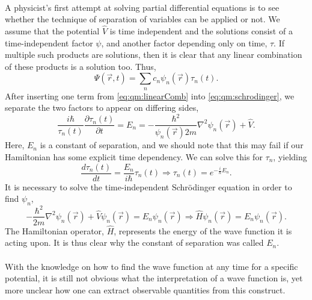 \paragraph*{}
A physicist's first attempt at solving partial differential equations is to see whether the technique of separation of variables can be applied or not.
We assume that the potential $\hat{V}$ is time independent and the solutions consist of a time-independent factor $\psi$, and another factor depending only on time, $\tau$.
If multiple such products are solutions, then it is clear that any linear
combination of these products is a solution too.
Thus,
\begin{equation}
\label{eq:qm:linearComb}
\Psi(\vec{r},t) = \sum_n c_n \psi_n(\vec{r}) \tau_n(t).
\end{equation}
After inserting one term from \eqref{eq:qm:linearComb} into \eqref{eq:qm:schrodinger}, we separate the two factors to appear on
differing sides,
\begin{equation}
\frac{i\hbar}{\tau_n(t)} \frac{\partial \tau_n(t)}{\partial t} =
E_n =
- \frac{\hbar^2}{\psi_n(\vec{r}) 2m} \nabla^2 \psi_n(\vec{r}) + \hat{V} .
\end{equation}
Here, $E_n$ is a constant of separation, and we should note that this may fail
if our Hamiltonian has some explicit time dependency.
We can solve this for $\tau_n$, yielding
\begin{equation}
\frac{d\tau_n(t)}{dt} = \frac{E_n}{i\hbar} \tau_n(t)
\Rightarrow
\tau_n(t) = e^{-\frac{i}{\hbar}E_n} .
\end{equation}
It is necessary to solve the time-independent Schrödinger
equation in order to find $\psi_n$,
\begin{equation}
\label{eq:qm:schrodingernotime}
- \frac{\hbar^2}{2m} \nabla^2 \psi_n(\vec{r}) + \hat{V} \psi_n(\vec{r}) = E_n
\psi_n(\vec{r})
\Rightarrow
\hat{H} \psi_n(\vec{r}) = E_n \psi_n(\vec{r}) .
\end{equation}
The Hamiltonian operator, $\hat{H}$, represents the energy of the wave function it is acting upon.
It is thus clear why the constant of separation was called $E_n$.


\paragraph*{}
With the knowledge on how to find the wave function at any time for a
specific potential, it is still not obvious what the interpretation of a wave
function is, yet more unclear how one can extract observable quantities from
this construct.

